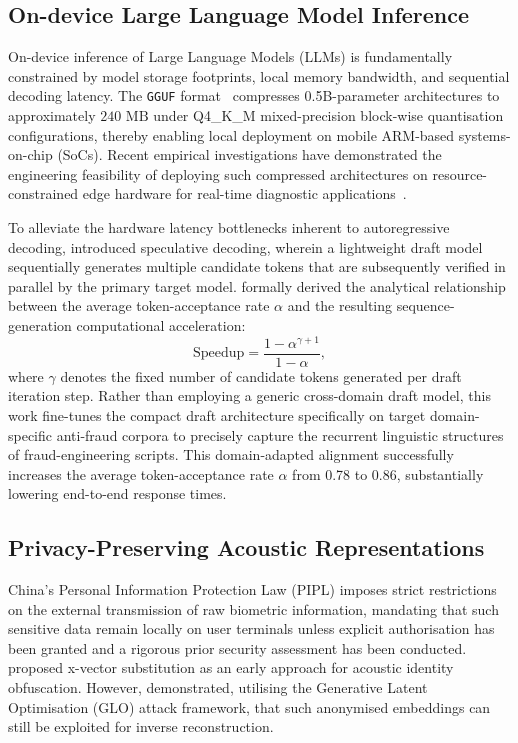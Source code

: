 \documentclass[a4paper,fleqn]{cas-sc}
\begin{document}
\subsection{On-device Large Language Model Inference}

On-device inference of Large Language Models (LLMs) is fundamentally constrained by model storage footprints, local memory bandwidth, and sequential decoding latency. The \texttt{GGUF} format~\citep{17} compresses 0.5B-parameter architectures to approximately $240\text{~MB}$ under Q4\_K\_M mixed-precision block-wise quantisation configurations, thereby enabling local deployment on mobile ARM-based systems-on-chip (SoCs). Recent empirical investigations have demonstrated the engineering feasibility of deploying such compressed architectures on resource-constrained edge hardware for real-time diagnostic applications~\citep{PereiraESWA2025}.

To alleviate the hardware latency bottlenecks inherent to autoregressive decoding, \citet{20} introduced speculative decoding, wherein a lightweight draft model sequentially generates multiple candidate tokens that are subsequently verified in parallel by the primary target model. \citet{21} formally derived the analytical relationship between the average token-acceptance rate $\alpha$ and the resulting sequence-generation computational acceleration:
\begin{equation}
\label{eq:speedup}
\text{Speedup} = \frac{1-\alpha^{\gamma+1}}{1-\alpha},
\end{equation}
where $\gamma$ denotes the fixed number of candidate tokens generated per draft iteration step. Rather than employing a generic cross-domain draft model, this work fine-tunes the compact draft architecture specifically on target domain-specific anti-fraud corpora to precisely capture the recurrent linguistic structures of fraud-engineering scripts. This domain-adapted alignment successfully increases the average token-acceptance rate $\alpha$ from 0.78 to 0.86, substantially lowering end-to-end response times.

\subsection{Privacy-Preserving Acoustic Representations}

China's Personal Information Protection Law (PIPL) imposes strict restrictions on the external transmission of raw biometric information, mandating that such sensitive data remain locally on user terminals unless explicit authorisation has been granted and a rigorous prior security assessment has been conducted. \citet{22} proposed x-vector substitution as an early approach for acoustic identity obfuscation. However, \citet{23} demonstrated, utilising the Generative Latent Optimisation (GLO) attack framework, that such anonymised embeddings can still be exploited for inverse reconstruction.
\end{document}
